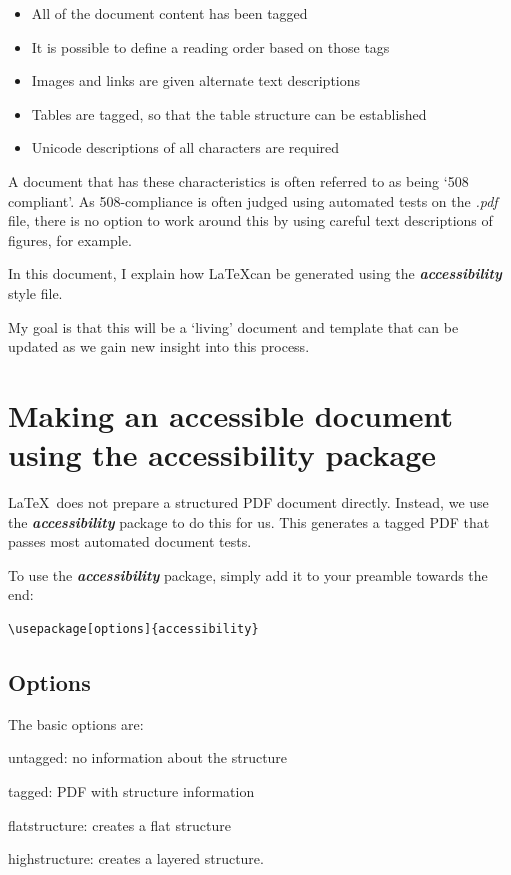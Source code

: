 \documentclass[10pt,oneocolumn]{article}
\newcommand{\fn}[1]{\emph{#1}}
\newcommand{\packagename}[1]{\textbf{\emph{#1}}}
\begin{document}
\begin{itemize}
\item All of the document content has been tagged
\item It is possible to define a reading order based on those tags
\item Images and links are given alternate text descriptions
\item Tables are tagged, so that the table structure can be established
\item Unicode descriptions of all characters are required
\end{itemize}

A document that has these characteristics is often referred to as being `508 compliant'. As 508-compliance is often judged using automated tests on the \fn{.pdf} file, there is no option to work around this by using careful text descriptions of figures, for example.

In this document, I explain how \LaTeX can be generated using the \packagename{accessibility} style file.

My goal is that this will be a `living' document and template that can be updated as we gain new insight into this process.

\section{Making an accessible document using the accessibility package}
\LaTeX\ does not prepare a structured PDF document directly. Instead, we use the \packagename{accessibility} package to do this for us. This generates a tagged PDF that passes most automated document tests.

To use the \packagename{accessibility} package, simply add it to your preamble towards the end:

\begin{lstlisting}[language={[LaTeX]TeX}]
\usepackage[options]{accessibility}
\end{lstlisting}

\subsection{Options}
The basic options are:
\begin{description}
\item{untagged}: no information about the structure
\item tagged: PDF with structure information
\item flatstructure: creates a flat structure
\item	highstructure: creates a layered structure.
\end{description}
\end{document}
